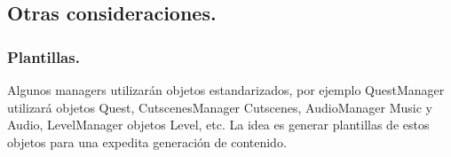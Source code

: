 \subsection{Otras consideraciones.}\label{modelado:managers-otras-consideraciones}
\subsubsection{Plantillas.}
Algunos managers utilizarán objetos estandarizados, por ejemplo QuestManager utilizará objetos Quest, CutscenesManager Cutscenes, AudioManager Music y Audio, LevelManager objetos Level, etc. La idea es generar plantillas de estos objetos para una expedita generación de contenido.